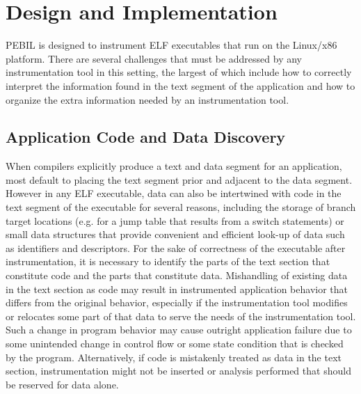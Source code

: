 \section{Design and Implementation}
\label{sec:Overview}

PEBIL is designed to instrument ELF executables that run on the Linux/x86
platform. There are several challenges that must be addressed by any
instrumentation tool in this setting, the largest of which include how to
correctly interpret the information found in the text segment of the application
and how to organize the extra information needed by an instrumentation tool.

\subsection{Application Code and Data Discovery}
When compilers explicitly produce a text and data segment for an application,
most default to placing the text segment prior and adjacent to the data segment.
However in any ELF executable, data can also be intertwined with code in the
text segment of the executable for several reasons, including the storage of
branch target locations (e.g. for a jump table that results from a switch
statements) or small data structures that provide convenient and efficient
look-up of data such as identifiers and descriptors. For the sake of correctness
of the executable after instrumentation, it is necessary to identify the parts
of the text section that constitute code and the parts that constitute data.
Mishandling of existing data in the text section as code may result in
instrumented application behavior that differs from the original behavior,
especially if the instrumentation tool modifies or relocates some part of that
data to serve the needs of the instrumentation tool. Such a change in program
behavior may cause outright application failure due to some unintended change in
control flow or some state condition that is checked by the program.
Alternatively, if code is mistakenly treated as data in the text section,
instrumentation might not be inserted or analysis performed that should be
reserved for data alone.

